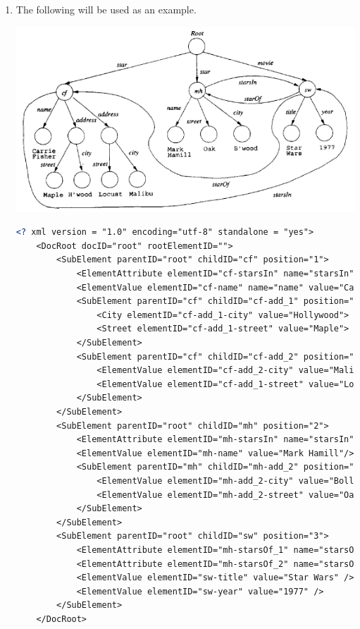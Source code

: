 \documentclass[12pt]{article}
\begin{document}
\begin{enumerate}[1.]
    \item

    \bigskip

    The following will be used as an example.

    \bigskip

    \begin{center}
    \includegraphics[width=\linewidth]{images/worksheet_9_solution_10.png}
    \end{center}

    \bigskip

    \begin{lstlisting}[language=XML]
    <? xml version = "1.0" encoding="utf-8" standalone = "yes">
    <DocRoot docID="root" rootElementID="">
        <SubElement parentID="root" childID="cf" position="1">
            <ElementAttribute elementID="cf-starsIn" name="starsIn" value="sw"/>
            <ElementValue elementID="cf-name" name="name" value="Carrie Fisher"/>
            <SubElement parentID="cf" childID="cf-add_1" position="1">
                <City elementID="cf-add_1-city" value="Hollywood">
                <Street elementID="cf-add_1-street" value="Maple">
            </SubElement>
            <SubElement parentID="cf" childID="cf-add_2" position="2">
                <ElementValue elementID="cf-add_2-city" value="Malibu">
                <ElementValue elementID="cf-add_1-street" value="Locust">
            </SubElement>
        </SubElement>
        <SubElement parentID="root" childID="mh" position="2">
            <ElementAttribute elementID="mh-starsIn" name="starsIn" value="sw"/>
            <ElementValue elementID="mh-name" value="Mark Hamill"/>
            <SubElement parentID="mh" childID="mh-add_2" position="1">
                <ElementValue elementID="mh-add_2-city" value="Bollywood">
                <ElementValue elementID="mh-add_2-street" value="Oak">
            </SubElement>
        </SubElement>
        <SubElement parentID="root" childID="sw" position="3">
            <ElementAttribute elementID="mh-starsOf_1" name="starsOf" value="cf"/>
            <ElementAttribute elementID="mh-starsOf_2" name="starsOf" value="mh"/>
            <ElementValue elementID="sw-title" value="Star Wars" />
            <ElementValue elementID="sw-year" value="1977" />
        </SubElement>
    </DocRoot>
    \end{lstlisting}


\end{enumerate}
\end{document}
